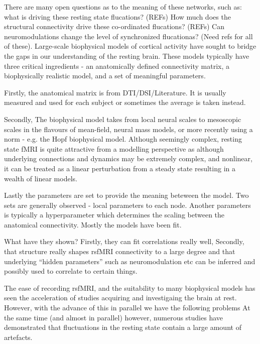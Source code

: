 \documentclass[oneside]{zHenriquesLab-StyleBioRxiv}
\begin{document}
There are many open questions as to the meaning of these networks, such as: what is driving these resting state flucations? (REFs) How much does the structural connectivity drive these co-ordinated flucations? (REFs) Can neuromodulations change the level of synchronized flucationas? (Need refs for all of these). Large-scale biophysical models of cortical activity have sought to bridge the gaps in our understanding of the resting brain. These models typically have three critical ingredients - an anatomically defined connectivity matrix, a biophysically realistic model, and a set of meaningful parameters. 

Firstly, the anatomical matrix is from DTI/DSI/Literature. It is usually measured and used for each subject or sometimes the average is taken instead.

Secondly, The biophysical model takes from local neural scales to mesoscopic scales in the flavours of mean-field, neural mass models, or more recently using a norm - e.g. the Hopf biophysical model. Although seemingly complex, resting state fMRI is quite attractive from a modelling perspective as although underlying connections and dynamics may be extremely complex, and nonlinear, it can be treated as a linear perturbation from a steady state resulting in a wealth of linear models.

Lastly the parameters are set to provide the meaning beteween the model. Two sets are generally observed - local parameters to each node. Another parameters is typically a hyperparameter which determines the scaling between the anatomical connectivity. Mostly the models have been fit. 

What have they shown? Firstly, they can fit correlations really well, 
Secondly, that structure really shapes rsfMRI connectivity to a large degree and that underlying ``hidden parameters'' such as neuromodulation etc can be inferred and possibly used to correlate to certain things. 


The ease of recording rsfMRI, and the suitability to many biophysical models has seen the acceleration of studies acquiring and investigaing the brain at rest.
However, with the advance of this in parallel we have the following problems
At the same time (and almost in parallel) however, numerous studies have demonstrated that fluctuations in the resting state contain a large amount of artefacts.
\end{document}
